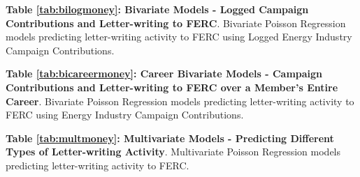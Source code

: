 \documentclass{article}
\begin{document}
\begin{table}[ht!]
    \centering
    
  \caption{\textbf{Table \ref{tab:bilogmoney}: Bivariate Models - Logged Campaign Contributions and Letter-writing to FERC}. Bivariate Poisson Regression models predicting letter-writing activity to FERC using Logged Energy Industry Campaign Contributions.}\label{tab:bilogmoney}
\end{table}



\begin{table}[ht!]
    \centering
 
  \caption{\textbf{Table \ref{tab:bicareermoney}: Career Bivariate Models - Campaign Contributions and Letter-writing to FERC over a Member's Entire Career}. Bivariate Poisson Regression models predicting letter-writing activity to FERC using Energy Industry Campaign Contributions.}\label{tab:bicareermoney}
\end{table}

%

\begin{table}
    \centering

  \caption{\textbf{Table \ref{tab:multmoney}: Multivariate Models - Predicting Different Types of Letter-writing Activity}. Multivariate Poisson Regression models predicting letter-writing activity to FERC.}\label{tab:multmoney}
\end{table}



\end{document}
